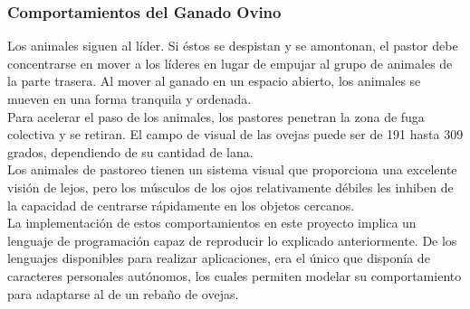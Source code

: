 \subsubsection{Comportamientos del Ganado Ovino}
\label{subsubsection:comportamientos}

Los animales siguen al líder. Si éstos se despistan y se amontonan, el pastor debe concentrarse en mover a los líderes en lugar de empujar 
al grupo de animales de la parte trasera. Al mover al ganado en un espacio abierto, los animales se mueven en una forma tranquila y ordenada.\\

Para acelerar el paso de los animales, los pastores penetran la zona de fuga colectiva y se retiran. El campo de visual de las ovejas puede 
ser de 191 hasta 309 grados, dependiendo de su cantidad de lana.\\

Los animales de pastoreo tienen un sistema visual que proporciona una excelente visión de lejos, pero los músculos de los ojos relativamente 
débiles les inhiben de la capacidad de centrarse rápidamente en los objetos cercanos.\\

La implementación de estos comportamientos en este proyecto implica un lenguaje de programación capaz de reproducir lo explicado anteriormente.
De los lenguajes disponibles para realizar aplicaciones, \lluvia{} era el único que disponía de caracteres personales autónomos, los cuales 
permiten modelar su comportamiento para adaptarse al de un rebaño de ovejas.




